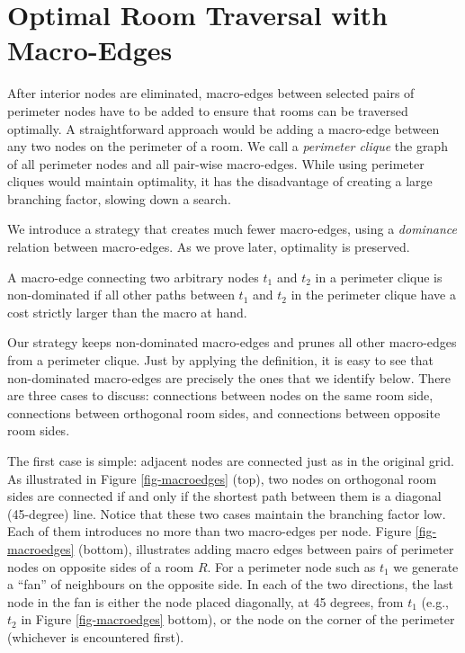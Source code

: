 \section{Optimal Room Traversal with Macro-Edges}

After interior nodes are eliminated, 
macro-edges between selected pairs of perimeter nodes 
have to be added to ensure that rooms can be traversed optimally.
A straightforward approach would be adding a macro-edge between 
any two nodes on the perimeter of a room. 
We call a \emph{perimeter clique} the graph of all perimeter nodes and
all pair-wise macro-edges.
While using perimeter cliques would maintain optimality, it has the disadvantage
of creating a large branching factor, slowing down a search.

We introduce a strategy that creates much fewer macro-edges, 
using a \emph{dominance} relation between macro-edges.
As we prove later, optimality is preserved.
%

\begin{definition}
A macro-edge connecting two 
arbitrary nodes $t_1$ and $t_2$ in a perimeter clique
is non-dominated if all other paths between $t_1$ and $t_2$
in the perimeter clique have a cost strictly larger than the macro at hand.
\end{definition}

Our strategy keeps non-dominated macro-edges and prunes all other macro-edges
from a perimeter clique.
Just by applying the definition, 
it is easy to see that non-dominated macro-edges are precisely the ones that
we identify below.
There are three cases to discuss: connections between nodes
on the same room side,
connections between orthogonal room sides, 
and connections between opposite room sides.

The first case is simple: adjacent nodes are connected just as in the original grid.
As illustrated in Figure \ref{fig-macroedges} (top),
two nodes on orthogonal room sides are connected if and only if
the shortest path between them is a diagonal (45-degree) line.
Notice that these two cases maintain the branching factor low.
Each of them introduces no more than two macro-edges per node.
Figure \ref{fig-macroedges} (bottom), illustrates adding macro 
edges between pairs of perimeter nodes on opposite sides of a room $R$.
For a perimeter node such as $t_1$ we generate a ``fan'' of neighbours on the opposite side. 
In each of the two directions, the last node in the fan is either 
the node placed diagonally, at 45 degrees, from $t_1$ (e.g., $t_2$ in Figure \ref{fig-macroedges} bottom),
or the node on the corner of the perimeter (whichever is encountered first).

